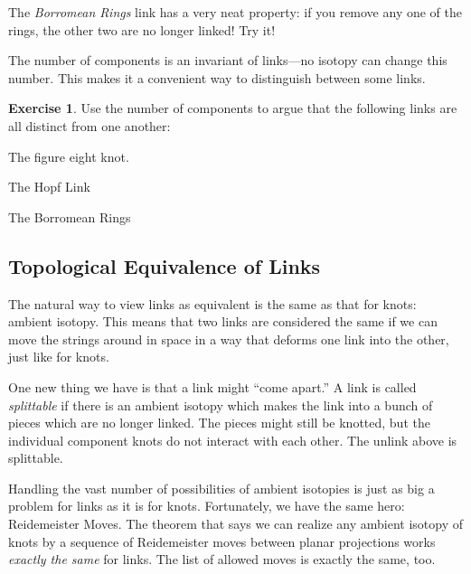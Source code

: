 \documentclass[12pt,letterpaper]{article}
\theoremstyle{definition}
\newtheorem{exercise}[question]{Exercise}
\begin{document}
The \emph{Borromean Rings} link has a very neat property: if you remove any one of the rings, the other two are no longer linked!
Try it!

The number of components is an invariant of links---no isotopy can change this number.
This makes it a convenient way to distinguish between some links.

\begin{exercise}
Use the number of components to argue that the following links are all distinct from one another:
\begin{compactitem}
\item The figure eight knot.
\item The Hopf Link
\item The Borromean Rings
\end{compactitem}
\end{exercise}

\subsection*{Topological Equivalence of Links}

The natural way to view links as equivalent is the same as that for knots: ambient isotopy.
This means that two links are considered the same if we can move the strings around in space in a way that deforms one link into the other, just like for knots.

One new thing we have is that a link might ``come apart.'' A link is called \emph{splittable} if there is an ambient isotopy which makes the link into a bunch of pieces which are no longer linked.
The pieces might still be knotted, but the individual component knots do not interact with each other.
The unlink above is splittable.

Handling the vast number of possibilities of ambient isotopies is just as big a problem for links as it is for knots.
Fortunately, we have the same hero: Reidemeister Moves. 
The theorem that says we can realize any ambient isotopy of knots by a sequence of Reidemeister moves between planar projections works \emph{exactly the same} for links.
The list of allowed moves is exactly the same, too.
\end{document}
